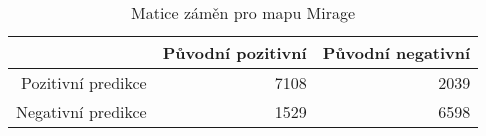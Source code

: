 \begin{table}[H]
\centering
\begin{tabular}{rrr}
  \hline
 & Původní pozitivní & Původní negativní \\ 
  \hline
Pozitivní predikce & 7108 & 2039 \\ 
  Negativní predikce & 1529 & 6598 \\ 
   \hline
\end{tabular}
\caption{\label{tab:mirage_pro_hrace_matice}Matice záměn pro mapu Mirage} 
\end{table}
